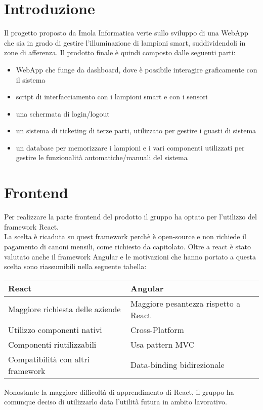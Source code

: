 \documentclass[12pt]{article}
\begin{document}
\section{Introduzione}
Il progetto proposto da Imola Informatica verte sullo sviluppo di una WebApp che sia in grado di gestire l'illuminazione di lampioni smart, suddividendoli in zone di afferenza.
Il prodotto finale è quindi composto dalle seguenti parti:
\begin{itemize}
	\item WebApp che funge da dashboard, dove è possibile interagire graficamente con il sistema
	\item script di interfacciamento con i lampioni smart e con i sensori
	\item una schermata di login/logout
	\item un sistema di ticketing di terze parti, utilizzato per gestire i guasti di sistema
	\item un database per memorizzare i lampioni e i vari componenti utilizzati per gestire le funzionalità automatiche/manuali del sistema
\end{itemize}

\section{Frontend}
Per realizzare la parte frontend del prodotto il gruppo ha optato per l'utilizzo del framework React. \\
La scelta è ricaduta su quest framework perchè è open-source e non richiede il pagamento di canoni mensili, come richiesto da capitolato.
Oltre a react è stato valutato anche il framework Angular e le motivazioni che hanno portato a questa scelta sono riassumibili nella seguente tabella: \\
\begin{center}
\begin{tabular}{ |p{8cm}|p{8cm}| }
	\hline
	 \textbf{React} & \textbf{Angular}\\ 
	 \hline
	 Maggiore richiesta delle aziende & Maggiore pesantezza rispetto a React \\  
	 \hline
	 Utilizzo componenti nativi & Cross-Platform \\ 
	 \hline
	 Componenti riutilizzabili & Usa pattern MVC \\
	 \hline
	 Compatibilità con altri framework & Data-binding bidirezionale \\
	\hline
\end{tabular}
\end{center}
Nonostante la maggiore difficoltà di apprendimento di React, il gruppo ha comunque deciso di utilizzarlo data l'utilità futura in ambito lavorativo.
\end{document}
